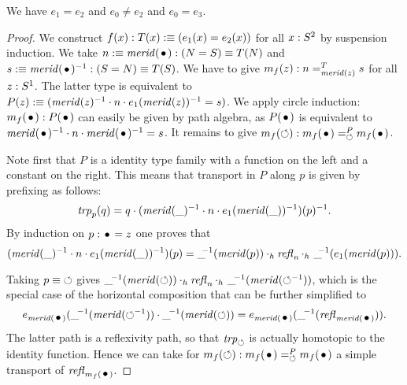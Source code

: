 \documentclass[english,a4]{article}
\begin{document}
\begin{lemma} We have $e_1 = e_2$ and $e_0 \neq e_2$ and $e_0 = e_3$.
\end{lemma}

\begin{proof}
We construct $f(x):T(x)\mathrel{\hbox{:}\mkern-5mu\equiv}(e_1(x)=e_2(x))$ for all $x:S^2$ by 
suspension induction. We take $n\defeq\mrd(\base):(N=S)\jdeq T(N)$ and 
$s\defeq\mrd(\base)^{-1}:(S=N)\jdeq T(S)$. 
We have to give $m_f(z): n=^T_{\mathit{merid}(z)}s$
for all $z:{S^1}$. The latter type is equivalent to
$P(z)\mathrel{\hbox{:}\mkern-5mu\equiv}(\mathit{merid}(z)^{-1}\cdot n\cdot e_1(\mathit{merid}(z))^{-1} = s)$.
We apply circle induction:
$m_f(\base): P(\base)$ can easily be given by path algebra,
as $P(\base)$ is equivalent to 
$\mrd(\base)^{-1}\cdot n\cdot\mrd(\base)^{-1} = s$.
It remains to give $m_f(\Sloop): m_f(\base)=^P_{\Sloop}m_f(\base)$.

Note first that $P$ is a identity type family with a function on the left
and a constant on the right. This means that transport in $P$ along $p$
is given by prefixing as follows:
\[
\mathop{\mathit{trp}^{}_{p}}(q) = q \cdot (\mathit{merid}(\_)^{-1}\cdot n \cdot e_1(\mathit{merid}(\_))^{-1})(p)^{-1}.
\]
By induction on $p:\base=z$ one proves that
\[
(\mathit{merid}(\_)^{-1}\cdot n \cdot e_1(\mathit{merid}(\_))^{-1})(p) = 
\_\!\!^{-1}(\mathit{merid}(p)) \cdot_h \mathop{{\mathit{refl}}_{n}} \cdot_h\  \_\!\!^{-1}(e_1(\mathit{merid}(p))).
\]
\begin{center}
\end{center}

Taking $p\equiv{\mathord{\circlearrowleft}}$ gives
$\_\!^{-1}(\mathit{merid}(\mathord{\circlearrowleft})) \cdot_h \mathop{{\mathit{refl}}_{n}} \cdot_h\  \_\!^{-1}(\mathit{merid}(\mathord{\circlearrowleft}^{-1}))$,
which is the special case of the horizontal composition that can be further
simplified to
\begin{align}
  \label{eq:trp-for-e1=e2}
e_{\mrd(\base)}(\_\!^{-1}(\mrd(\Sloop^{-1})) \cdot\_\!^{-1}(\mrd(\Sloop)) = 
e_{\mrd(\base)}(\_\!^{-1}(\refl{\mrd(\base)})).
\end{align}
The latter path is a reflexivity path, so that $\mathop{\mathit{trp}^{}_{\mathord{\circlearrowleft}}}$ is actually homotopic 
to the identity function. Hence we can take for 
$m_f(\Sloop): m_f(\base)=^P_{\Sloop}m_f(\base)$ a simple transport of $\refl{m_f(\base)}$.


\end{proof}
\end{document}
